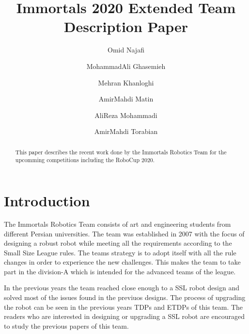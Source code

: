 \documentclass[runningheads]{llncs}
\begin{document}
%
\title{Immortals 2020 Extended Team Description Paper}
%
%
\author{Omid Najafi \and
MohammadAli Ghasemieh \and
Mehran Khanloghi \and
AmirMahdi Matin \and
AliReza Mohammadi \and
AmirMahdi Torabian}
%
%
%
\maketitle              %
%
\begin{abstract}
This paper describes the recent work done by the Immortals Robotics Team for the upcomming competitions including the RoboCup 2020.

\end{abstract}
%
%
%
\section{Introduction}
The Immortals Robotics Team consists of art and engineering students from different Persian universities.
The team was established in 2007 with the focus of designing a robust robot while meeting all the requirements according to the Small Size League rules. The teams strategy is to adopt itself with all the rule changes in order to experience the new challenges. This makes the team to take part in the division-A which is intended for the advanced teams of the league.

In the previous years the team reached close enough to a SSL robot design and solved most of the issues found in the previuos designs. The process of upgrading the robot can be seen in the previous years TDPs and ETDPs of this team. The readers who are interested in designing or upgrading a SSL robot are encouraged to study the previous papers of this team.
\end{document}
